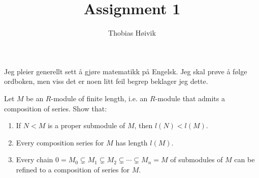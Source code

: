 

\title{\huge{Assignment 1}}
\author{\LARGE{Thobias Høivik}}
\date{}


\maketitle

\newpage
Jeg pleier generellt sett å gjøre matematikk 
på Engelsk. Jeg skal prøve å 
følge ordboken, men viss det 
er noen litt feil begrep beklager 
jeg dette. 

\begin{prob*}[1]
    Let $M$ be an $R$-module of finite length, i.e. 
    an $R$-module that admits a composition of series. 
    Show that: 
    \begin{enumerate}[label=\alph*)]
        \item If $N < M$ is a proper submodule of $M$, then
            $l(N) < l(M)$.  
        \item Every composition series for $M$ has length 
            $l(M)$. 
        \item Every chain $0 = M_0 \subsetneq M_1 \subsetneq 
            M_2 \subsetneq \cdots \subsetneq M_n = M$ of 
            submodules of $M$ can be refined to a composition 
            of series for $M$. 
    \end{enumerate}
\end{prob*}
